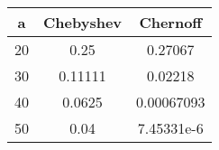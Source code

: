 \documentclass[9pt,letter]{article}
\begin{document}
\pagestyle{fancy}

\centering
\begin{tabular}{|c|c|c|}
\hline
a & Chebyshev & Chernoff\\
\hline
20 & 0.25 & 0.27067\\
30 & 0.11111 & 0.02218\\
40 & 0.0625 & 0.00067093\\
50 & 0.04 & 7.45331e-6\\
\hline
\end{tabular}
\end{document}
